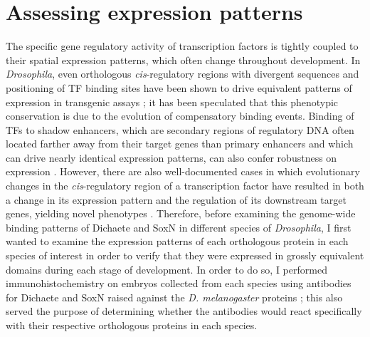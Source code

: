 \section{Assessing expression patterns}
The specific gene regulatory activity of transcription factors is tightly coupled to their spatial expression patterns, which often change throughout development. In \emph{Drosophila}, even orthologous \emph{cis}-regulatory regions with divergent sequences and positioning of TF binding sites have been shown to drive equivalent patterns of expression in transgenic assays \citep{hare_sepsid_2008}; it has been speculated that this phenotypic conservation is due to the evolution of compensatory binding events. Binding of TFs to shadow enhancers, which are secondary regions of regulatory DNA often located farther away from their target genes than primary enhancers and which can drive nearly identical expression patterns, can also confer robustness on expression \citep{ludwig_consequences_2011,perry_shadow_2010}. However, there are also well-documented cases in which evolutionary changes in the \emph{cis}-regulatory region of a transcription factor have resulted in both a change in its expression pattern and the regulation of its downstream target genes, yielding novel phenotypes \citep{arnoult_emergence_2013,frankel_conserved_2012}. Therefore, before examining the genome-wide binding patterns of Dichaete and SoxN in different species of \emph{Drosophila}, I first wanted to examine the expression patterns of each orthologous protein in each species of interest in order to verify that they were expressed in grossly equivalent domains during each stage of development. In order to do so, I performed immunohistochemistry on embryos collected from each species using antibodies for Dichaete and SoxN raised against the \emph{D. melanogaster} proteins \citep{ferrero_soxneuro_2014,soriano_drosophila_1998}; this also served the purpose of determining whether the antibodies would react specifically with their respective orthologous proteins in each species.\\

